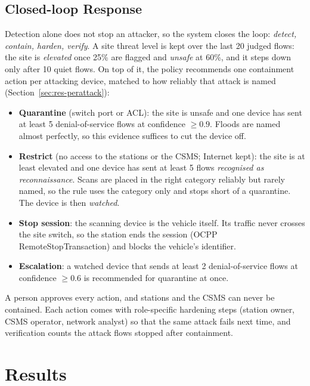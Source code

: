 \documentclass[preprint,12pt]{elsarticle}
\begin{document}
\subsection{Closed-loop Response}
\label{sec:response}

Detection alone does not stop an attacker, so the system closes the loop: \emph{detect, contain, harden, verify}. A site threat level is kept over the last 20 judged flows: the site is \emph{elevated} once 25\% are flagged and \emph{unsafe} at 60\%, and it steps down only after 10 quiet flows. On top of it, the policy recommends one containment action per attacking device, matched to how reliably that attack is named (Section~\ref{sec:res-perattack}):
\begin{itemize}
    \item \textbf{Quarantine} (switch port or ACL): the site is unsafe and one device has sent at least 5 denial-of-service flows at confidence $\ge 0.9$. Floods are named almost perfectly, so this evidence suffices to cut the device off.
    \item \textbf{Restrict} (no access to the stations or the CSMS; Internet kept): the site is at least elevated and one device has sent at least 5 flows \emph{recognised as reconnaissance}. Scans are placed in the right category reliably but rarely named, so the rule uses the category only and stops short of a quarantine. The device is then \emph{watched}.
    \item \textbf{Stop session}: the scanning device is the vehicle itself. Its traffic never crosses the site switch, so the station ends the session (OCPP RemoteStopTransaction) and blocks the vehicle's identifier.
    \item \textbf{Escalation}: a watched device that sends at least 2 denial-of-service flows at confidence $\ge 0.6$ is recommended for quarantine at once.
\end{itemize}
A person approves every action, and stations and the CSMS can never be contained. Each action comes with role-specific hardening steps (station owner, CSMS operator, network analyst) so that the same attack fails next time, and verification counts the attack flows stopped after containment.

\section{Results}
\label{sec:results}
\end{document}
